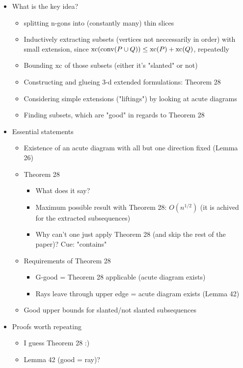 \begin{itemize}
  \item What is the key idea?
  \begin{itemize}
    \item splitting n-gons into (constantly many) thin slices
    \item Inductively extracting subsets (vertices not neccessarily in order) with small extension, since $\operatorname{xc}(\operatorname{conv}(P \cup Q)) \leq \operatorname{xc}(P) + \operatorname{xc}(Q)$, repeatedly
    \item Bounding $\operatorname{xc}$ of those subsets (either it's "slanted" or not)
    \item Constructing and glueing 3-d extended formulations: Theorem 28
    \item Considering simple extensions ("liftings") by looking at acute diagrams
    \item Finding subsets, which are "good" in regards to Theorem 28
  \end{itemize}
  \item Essential statements
  \begin{itemize}
    \item Existence of an acute diagram with all but one direction fixed (Lemma 26)
    \item Theorem 28
    \begin{itemize}
      \item What does it say?
      \item Maximum possible result with Theorem 28: $O(n^{1/2})$ (it is achived for the extracted subsequences)
      \item Why can't one just apply Theorem 28 (and skip the rest of the paper)? Cue: "contains"
    \end{itemize}
    \item Requirements of Theorem 28
    \begin{itemize}
      \item G-good = Theorem 28 applicable (acute diagram exists)
      \item Rays leave through upper edge = acute diagram exists (Lemma 42)
    \end{itemize}
    \item Good upper bounds for slanted/not slanted subsequences
  \end{itemize}
  \item Proofs worth repeating
  \begin{itemize}
    \item I guess Theorem 28 :)
    \item Lemma 42 (good = ray)?

\end{itemize}
\end{itemize}

